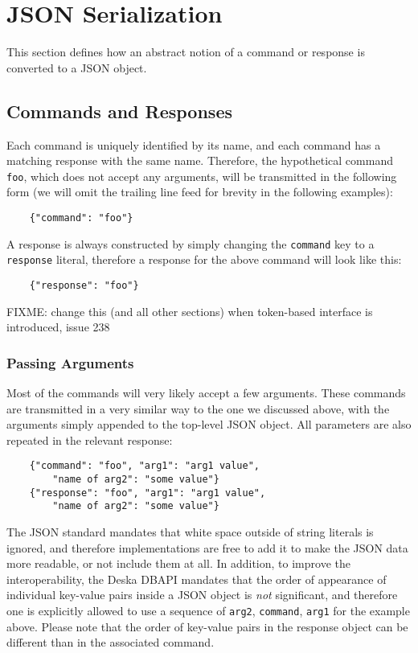 \documentclass{article}
\begin{document}
\section{JSON Serialization}

This section defines how an abstract notion of a command or response is converted to a JSON object.

\subsection{Commands and Responses}

Each command is uniquely identified by its name, and each command has a matching response with the same name. Therefore,
the hypothetical command {\tt foo}, which does not accept any arguments, will be transmitted in the following form (we
will omit the trailing line feed for brevity in the following examples):

\begin{lstlisting}
    {"command": "foo"}
\end{lstlisting}

A response is always constructed by simply changing the {\tt command} key to a {\tt response} literal, therefore a
response for the above command will look like this:

\begin{lstlisting}
    {"response": "foo"}
\end{lstlisting}

FIXME: change this (and all other sections) when token-based interface is introduced, issue 238

\subsubsection{Passing Arguments}

Most of the commands will very likely accept a few arguments.  These commands are transmitted in a very similar way to
the one we discussed above, with the arguments simply appended to the top-level JSON object.  All parameters are also
repeated in the relevant response:

\begin{lstlisting}
    {"command": "foo", "arg1": "arg1 value",
        "name of arg2": "some value"}
    {"response": "foo", "arg1": "arg1 value",
        "name of arg2": "some value"}
\end{lstlisting}

The JSON standard mandates that white space outside of string literals is ignored, and therefore implementations are
free to add it to make the JSON data more readable, or not include them at all.  In addition, to improve the
interoperability, the Deska DBAPI mandates that the order of appearance of individual key-value pairs inside a JSON
object is {\em not} significant, and therefore one is explicitly allowed to use a sequence of {\tt arg2}, {\tt command},
{\tt arg1} for the example above.  Please note that the order of key-value pairs in the response object can be different
than in the associated command.
\end{document}
